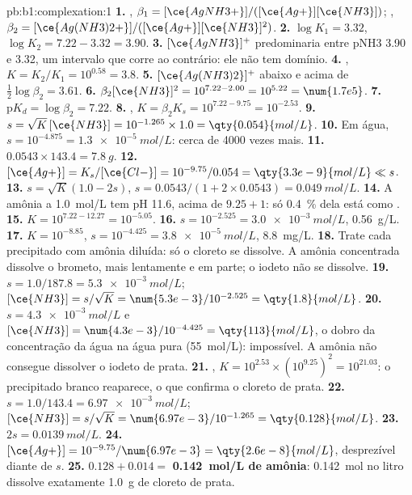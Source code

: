 \begin{solution}{pb:b1:complexation:1}
\textbf{1.} , $\beta_1 = [\ce{AgNH3+}]/([\ce{Ag+}][\ce{NH3}])$;
, $\beta_2 = [\ce{Ag(NH3)2+}]/([\ce{Ag+}][\ce{NH3}]^2)$.
\textbf{2.} $\log K_1 = 3.32$, $\log K_2 = 7.22 - 3.32 = 3.90$.
\textbf{3.} $[\ce{AgNH3}]^{+}$ predominaria entre pNH3 3.90 e 3.32, um
intervalo que corre ao contrário: ele não tem domínio.
\textbf{4.} , $K = K_2/K_1 = 10^{0.58} =
3.8$.
\textbf{5.} $[\ce{Ag(NH3)2}]^{+}$ abaixo e  acima de
$\frac12\log\beta_2 = 3.61$.
\textbf{6.} $\beta_2[\ce{NH3}]^2 = 10^{7.22 - 2.00} = 10^{5.22} = \num{1.7e5}$.
\textbf{7.} $\mathrm{p}K_d = \log\beta_2 = 7.22$.
\textbf{8.} , $K = \beta_2K_s =
10^{7.22 - 9.75} = 10^{-2.53}$.
\textbf{9.} $s = \sqrt{K}\,[\ce{NH3}] = 10^{-1.265} \times 1.0 =
\qty{0.054}{mol/L}$.
\textbf{10.} Em água, $s = 10^{-4.875} = \qty{1.3e-5}{mol/L}$: cerca de 4000
vezes mais.
\textbf{11.} $0.0543 \times 143.4 = \qty{7.8}{g}$.
\textbf{12.} $[\ce{Ag+}] = K_s/[\ce{Cl-}] = 10^{-9.75}/0.054 =
\qty{3.3e-9}{mol/L} \ll s$.
\textbf{13.} $s = \sqrt{K}(1.0 - 2s)$, $s = 0.0543/(1 + 2 \times 0.0543) =
\qty{0.049}{mol/L}$.
\textbf{14.} A amônia a \qty{1.0}{mol/L} tem pH 11.6, acima de $9.25 + 1$:
só \qty{0.4}{\percent} dela está como .
\textbf{15.} $K = 10^{7.22 - 12.27} = 10^{-5.05}$.
\textbf{16.} $s = 10^{-2.525} = \qty{3.0e-3}{mol/L}$, \qty{0.56}{g/L}.
\textbf{17.} $K = 10^{-8.85}$, $s = 10^{-4.425} = \qty{3.8e-5}{mol/L}$,
\qty{8.8}{mg/L}.
\textbf{18.} Trate cada precipitado com amônia diluída: só o cloreto se
dissolve. A amônia concentrada dissolve o brometo, mais lentamente e em
parte; o iodeto não se dissolve.
\textbf{19.} $s = 1.0/187.8 = \qty{5.3e-3}{mol/L}$; $[\ce{NH3}] = s/\sqrt{K}
= \num{5.3e-3}/10^{-2.525} = \qty{1.8}{mol/L}$.
\textbf{20.} $s = \qty{4.3e-3}{mol/L}$ e $[\ce{NH3}] = \num{4.3e-3}/10^{-4.425}
= \qty{113}{mol/L}$, o dobro da concentração da água na água pura
(\qty{55}{mol/L}): impossível. A amônia não consegue dissolver o iodeto
de prata.
\textbf{21.} ,
$K = 10^{2.53} \times (10^{9.25})^2 = 10^{21.03}$: o precipitado branco
reaparece, o que confirma o cloreto de prata.
\textbf{22.} $s = 1.0/143.4 = \qty{6.97e-3}{mol/L}$; $[\ce{NH3}] =
s/\sqrt{K} = \num{6.97e-3}/10^{-1.265} = \qty{0.128}{mol/L}$.
\textbf{23.} $2s = \qty{0.0139}{mol/L}$.
\textbf{24.} $[\ce{Ag+}] = 10^{-9.75}/\num{6.97e-3} = \qty{2.6e-8}{mol/L}$,
desprezível diante de $s$.
\textbf{25.} $0.128 + 0.014 = $ \textbf{\qty{0.142}{mol/L} de amônia}:
\qty{0.142}{mol} no litro dissolve exatamente \qty{1.0}{g} de cloreto de
prata.
\end{solution}
